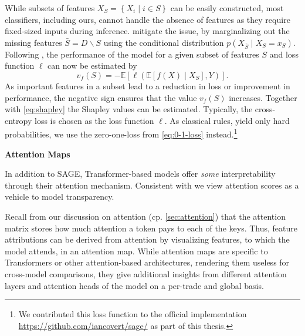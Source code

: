 While subsets of features $X_S = \left\{X_i \mid i \in S \right\}$ can be easily constructed, most classifiers, including ours, cannot handle the absence of features as they require fixed-sized inputs during inference. \textcite[\checkmark][17213]{covertUnderstandingGlobalFeature2020} mitigate the issue, by marginalizing out the missing features $\bar{S}=D\backslash S$ using the conditional distribution $p(X_{\bar{S}} \mid X_S=x_S)$. Following \textcite[\checkmark][17215--17216]{covertUnderstandingGlobalFeature2020}, the performance of the model for a given subset of features $S$ and loss function $\ell$ can now be estimated by
\begin{equation}
v_f(S)=-\mathbb{E}\left[\ell\left(\mathbb{E}\left[f(X) \mid X_S\right], Y\right)\right].
\end{equation}
As important features in a subset lead to a reduction in loss or improvement in performance, the negative sign ensures that the value $v_f(S)$ increases. Together with \cref{eq:shapley} the Shapley values can be estimated. Typically, the cross-entropy loss is chosen as the loss function $\ell$. As classical rules, yield only hard probabilities, we use the zero-one-loss from \cref{eq:0-1-loss} instead.\footnote{We contributed this loss function to the official implementation \url{https://github.com/iancovert/sage/} as part of this thesis.} 

\textbf{Attention Maps}

In addition to \gls{SAGE}, Transformer-based models offer \emph{some} interpretability through their attention mechanism. Consistent with \textcite[\checkmark][18]{wiegreffeAttentionNotNot2019} we view attention scores as a vehicle to model transparency.

Recall from our discussion on attention (cp. \cref{sec:attention}) that the attention matrix stores how much attention a token pays to each of the keys. Thus, feature attributions can be derived from attention by visualizing features, to which the model attends, in an attention map. While attention maps are specific to Transformers or other attention-based architectures, rendering them useless for cross-model comparisons, they give additional insights from different attention layers and attention heads of the model on a per-trade and global basis.

